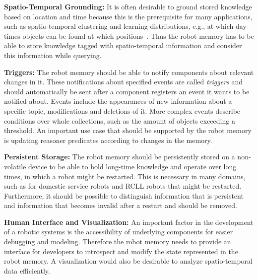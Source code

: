 \textbf{Spatio-Temporal Grounding:} It is often desirable to ground
stored knowledge based on location and time because this is the
prerequisite for many applications, such as spatio-temporal clustering
and learning distributions, e.g., at which day-times objects can be
found at which positions~\cite{deebul}. Thus the robot
memory has to be able to store knowledge tagged with spatio-temporal
information and consider this information while querying.

\textbf{Triggers:} The robot memory should be able to notify
components about relevant changes in it. These notifications
about specified events are called \emph{triggers} and should
automatically be sent after a component registers an event it wants to
be notified about. Events include the appearances of new information
about a specific topic, modifications and deletions of it. More
complex events describe conditions over whole collections, such as the
amount of objects exceeding a threshold.
An important use case that should be supported by the robot memory is
updating reasoner predicates according to changes in the memory.

\textbf{Persistent Storage:} The robot memory should be persistently
stored on a non-volatile device
to be able to hold long-time knowledge and operate over long times,
in which a robot might be restarted. This is necessary in many
domains, such as for domestic service robots and RCLL robots that
might be restarted. Furthermore, it should be possible to distinguish
information that is persistent and information that becomes invalid
after a restart and should be removed.

\textbf{Human Interface and Visualization:} An important factor in the
development of a robotic systems is the accessibility of underlying
components for easier debugging and modeling. Therefore the robot
memory needs to provide an interface for developers to introspect and
modify the state represented in the robot memory. A visualization
would also be desirable to analyze spatio-temporal data efficiently.

